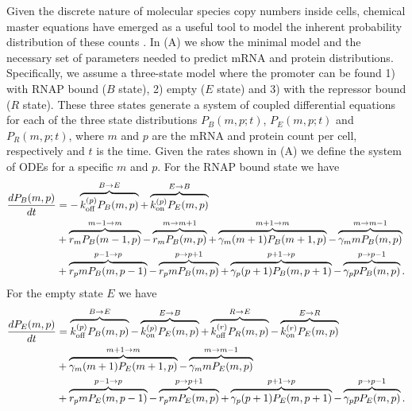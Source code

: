 Given the discrete nature of molecular species copy numbers inside cells,
chemical master equations have emerged as a useful tool to model the inherent
probability distribution of these counts \cite{Sanchez2013}. In
(A) we show the minimal model and the necessary set of
parameters needed to predict mRNA and protein distributions. Specifically, we
assume a three-state model where the promoter can be found 1) with RNAP bound
($B$ state), 2) empty ($E$ state) and 3) with the repressor bound ($R$ state).
These three states generate a system of coupled differential equations for each
of the three state distributions $P_B(m, p; t)$, $P_E(m, p; t)$ and $P_R(m, p;
t)$, where $m$ and $p$ are the mRNA and protein count per cell, respectively and
$t$ is the time. Given the rates shown in (A) we define
the system of ODEs for a specific $m$ and $p$. For the RNAP bound state we have
\begin{equation}
  \begin{aligned}
    \dt{P_B(m, p)} &=
    - \overbrace{\kpoff P_B(m, p)}^{B \rightarrow E} %
    + \overbrace{\kpon P_E(m, p)}^{E \rightarrow B}\\ %
    &+ \overbrace{r_m P_B(m-1, p)}^{m-1 \rightarrow m} %
    - \overbrace{r_m P_B(m, p)}^{m \rightarrow m+1}%
    + \overbrace{\gm (m + 1) P_B(m+1 , p)}^{m+1 \rightarrow m} %
    - \overbrace{\gm m P_B(m , p)}^{m \rightarrow m-1}\\ %
    &+ \overbrace{r_p m P_B(m, p - 1)}^{p-1 \rightarrow p} %
    - \overbrace{r_p m P_B(m, p)}^{p \rightarrow p+1} %
    + \overbrace{\gp (p + 1) P_B(m, p + 1)}^{p + 1 \rightarrow p} %
    - \overbrace{\gp p P_B(m, p)}^{p \rightarrow p-1}. %
  \end{aligned}
\end{equation}
For the empty state $E$ we have
\begin{equation}
  \begin{aligned}
    \dt{P_E(m, p)} &=
    \overbrace{\kpoff P_B(m, p)}^{B \rightarrow E} %
    - \overbrace{\kpon P_E(m, p)}^{E \rightarrow B} %
    + \overbrace{\kroff P_R(m, p)}^{R \rightarrow E} %
    - \overbrace{\kron P_E(m, p)}^{E \rightarrow R}\\ %
    &+ \overbrace{\gm (m + 1) P_E(m+1 , p)}^{m+1 \rightarrow m} %
    - \overbrace{\gm m P_E(m , p)}^{m \rightarrow m-1}\\ %
    &+ \overbrace{r_p m P_E(m, p - 1)}^{p-1 \rightarrow p} %
    - \overbrace{r_p m P_E(m, p)}^{p \rightarrow p+1} %
    + \overbrace{\gp (p + 1) P_E(m, p + 1)}^{p + 1 \rightarrow p} %
    - \overbrace{\gp p P_E(m, p)}^{p \rightarrow p-1}. %
  \end{aligned}
\end{equation}
